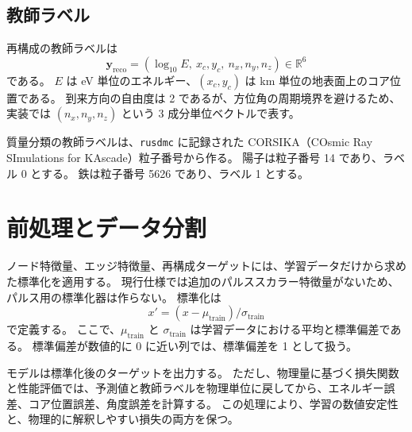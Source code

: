 \documentclass[lualatex,paper=a4,fontsize=9pt]{jlreq}
\newcommand{\code}[1]{\ifmmode\text{\ttfamily #1}\else\texttt{#1}\fi}
\newcommand{\R}{\mathbb{R}}
\begin{document}
\subsection{教師ラベル}

再構成の教師ラベルは
\[
\mathbf{y}_{\mathrm{reco}}=
(\log_{10}E,\ x_c,y_c,\ n_x,n_y,n_z)\in\R^6
\]
である。
$E$ は eV 単位のエネルギー、$(x_c,y_c)$ は km 単位の地表面上のコア位置である。
到来方向の自由度は 2 であるが、方位角の周期境界を避けるため、実装では $(n_x,n_y,n_z)$ という 3 成分単位ベクトルで表す。

質量分類の教師ラベルは、\code{rusdmc} に記録された CORSIKA（COsmic Ray SImulations for KAscade）粒子番号から作る。
陽子は粒子番号 14 であり、ラベル 0 とする。
鉄は粒子番号 5626 であり、ラベル 1 とする。

\section{前処理とデータ分割}

ノード特徴量、エッジ特徴量、再構成ターゲットには、学習データだけから求めた標準化を適用する。
現行仕様では追加のパルススカラー特徴量がないため、パルス用の標準化器は作らない。
標準化は
\[
  x'=(x-\mu_{\mathrm{train}})/\sigma_{\mathrm{train}}
\]
で定義する。
ここで、$\mu_{\mathrm{train}}$ と $\sigma_{\mathrm{train}}$ は学習データにおける平均と標準偏差である。
標準偏差が数値的に 0 に近い列では、標準偏差を 1 として扱う。

モデルは標準化後のターゲットを出力する。
ただし、物理量に基づく損失関数と性能評価では、予測値と教師ラベルを物理単位に戻してから、エネルギー誤差、コア位置誤差、角度誤差を計算する。
この処理により、学習の数値安定性と、物理的に解釈しやすい損失の両方を保つ。
\end{document}
